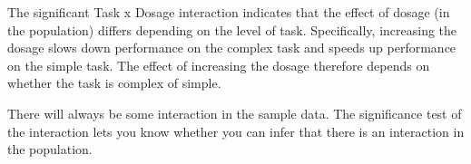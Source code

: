The significant Task x Dosage interaction indicates that the effect of dosage (in the population) differs depending on the level of task. Specifically, increasing the dosage slows down performance on the complex task and speeds up performance on the simple task. The effect of increasing the dosage therefore depends on whether the task is complex of simple.

There will always be some interaction in the sample data. The significance test of the interaction lets you know whether you can infer that there is an interaction in the population.

